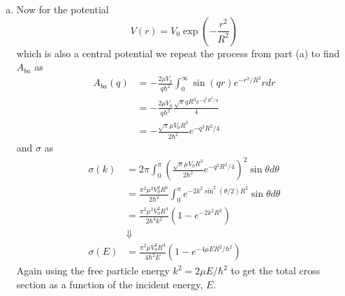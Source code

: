 \documentclass[11pt]{article}
\numberwithin{equation}{section}
\begin{document}
\begin{enumerate}[(a)]
\item Now for the potential 
$$V(r) = V_0\exp\left(-\frac{r^2}{R^2}\right)$$
which is also a central potential we repeat the process from part (a) to find $A_{ba}$ as
\begin{align*}
A_{ba}(q) &= -\frac{2\mu{V_0}}{q\hbar^2}\int_{0}^{\infty}\sin(qr)e^{-r^2/R^2}rdr\\
&= -\frac{2\mu{V_0}}{q\hbar^2}\frac{\sqrt{\pi}qR^3e^{-q^2R^2/4}}{4}\\
&= -\frac{\sqrt{\pi}\mu{V_0}R^3}{2\hbar^2}e^{-q^2R^2/4}
\end{align*}
and $\sigma$ as
\begin{align*}
\sigma(k) &= 2\pi\int_{0}^{\pi}\left(\frac{\sqrt{\pi}\mu{V_0}R^3}{2\hbar^2}e^{-q^2R^2/4}\right)^2\sin\theta{d\theta}\\
&= \frac{\pi^2\mu^2V_0^2R^6}{2\hbar^4}\int_{0}^{\pi}e^{-2k^2\sin^2(\theta/2)R^2}\sin\theta{d\theta}\\
&= \frac{\pi^2\mu^2V_0^2R^4}{2\hbar^4k^2}\left(1-e^{-2k^2R^2}\right)\\
&\Downarrow\\
\sigma(E) &= \frac{\pi^2{\mu}V_0^2R^4}{4\hbar^2E}\left(1-e^{-4\mu{E}R^2/\hbar^2}\right)
\end{align*}
Again using the free particle energy $k^2=2\mu{E}/\hbar^2$ to get the total cross section
as a function of the incident energy, $E$.
\end{enumerate}

\pagebreak
\end{document}
